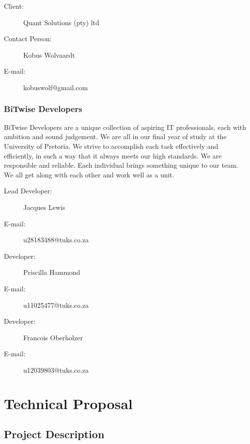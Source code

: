\documentclass[a4paper]{article}
\begin{document}
				\begin{description}
					\item[Client:] Quant Solutions (pty) ltd
					\item[Contact Person:] Kobus Wolvaardt
					\item[E-mail:] kobuswolf@gmail.com
				\end{description}
				
			\subsubsection{BiTwise Developers}
				
				BiTwise Developers are a unique collection of aspiring IT professionals, each with ambition and sound judgement. We are all in our final year of study at the University of Pretoria.
				We strive to accomplish each task effectively and efficiently, in such a way that it always meets our high standards. We are responsible and reliable. Each individual brings something 
				unique to our team. We all get along with each other and work well as a unit.
				
				\begin{description}
					\item[Lead Developer:] Jacques Lewis
					\item[E-mail:] u28183488@tuks.co.za
				\end{description}
				
				\begin{description}
					\item[Developer:] Priscilla Hammond
					\item[E-mail:] u11025477@tuks.co.za
				\end{description}
				
				\begin{description}
					\item[Developer:] Francois Oberholzer
					\item[E-mail:] u12039803@tuks.co.za
				\end{description}
			
	\section{Technical Proposal}
	
		\subsection{Project Description}
		
\end{document}
